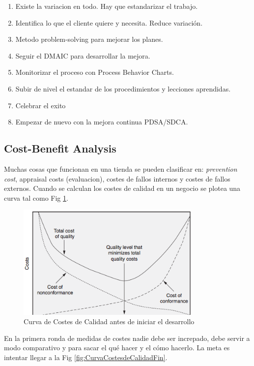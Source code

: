 \documentclass[]{article}
\begin{document}
\begin{enumerate}
	\item Existe la variacion en todo. Hay que estandarizar el trabajo.
	\item Identifica lo que el cliente quiere y necesita. Reduce variación.
	\item Metodo problem-solving para mejorar los planes.
	\item Seguir el DMAIC para desarrollar la mejora.
	\item Monitorizar el proceso con Process Behavior Charts.
	\item Subir de nivel el estandar de los procedimientos y lecciones aprendidas.
	\item Celebrar el exito
	\item Empezar de nuevo con la mejora continua PDSA/SDCA.
\end{enumerate}

\subsection{Cost-Benefit Analysis}

Muchas cosas que funcionan en una tienda se pueden clasificar en: \textit{prevention cost}, appraisal costs (evaluacion), costes de fallos internos y costes de fallos externos. 
Cuando se calculan los costes de calidad en un negocio se plotea una curva tal como Fig \ref{fig:CurvaCostesdeCalidadInicio}.
\begin{figure}[ht!]
\centering
\includegraphics[width=90mm]{imagenes/CurvaCostesCalidadInicio.png}
\caption{Curva de Costes de Calidad antes de iniciar el desarrollo}
\label{fig:CurvaCostesdeCalidadInicio}
\end{figure}

En la primera ronda de medidas de costes nadie debe ser increpado, debe servir a modo comparativo y para sacar el qué hacer y el cómo hacerlo. La meta es intentar llegar a la Fig \ref{fig:CurvaCostesdeCalidadFin}.
\end{document}
